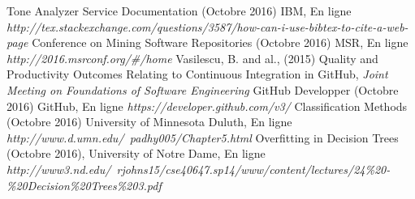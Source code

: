 \documentclass[10pt, conference]{IEEEtran}
\begin{document}
\balance

\begin{thebibliography}{1}
 Tone Analyzer Service Documentation (Octobre 2016) IBM, En ligne \emph{http://tex.stackexchange.com/questions/3587/how-can-i-use-bibtex-to-cite-a-web-page} 
 Conference on Mining Software Repositories (Octobre 2016) MSR, En ligne \emph{http://2016.msrconf.org/\#/home} 
 Vasilescu, B. and al., (2015) Quality and Productivity Outcomes Relating to
Continuous Integration in GitHub, \emph{Joint Meeting on Foundations of Software Engineering}
 GitHub Developper (Octobre 2016) GitHub, En ligne \emph{https://developer.github.com/v3/} 
 Classification Methods (Octobre 2016) University of Minnesota Duluth, En ligne \emph{http://www.d.umn.edu/~padhy005/Chapter5.html} 
 Overfitting in Decision Trees (Octobre 2016), University of Notre Dame, En ligne \emph{http://www3.nd.edu/~rjohns15/cse40647.sp14/www/content/lectures/24\%20-\%20Decision\%20Trees\%203.pdf} 
\end{thebibliography}
\end{document}
